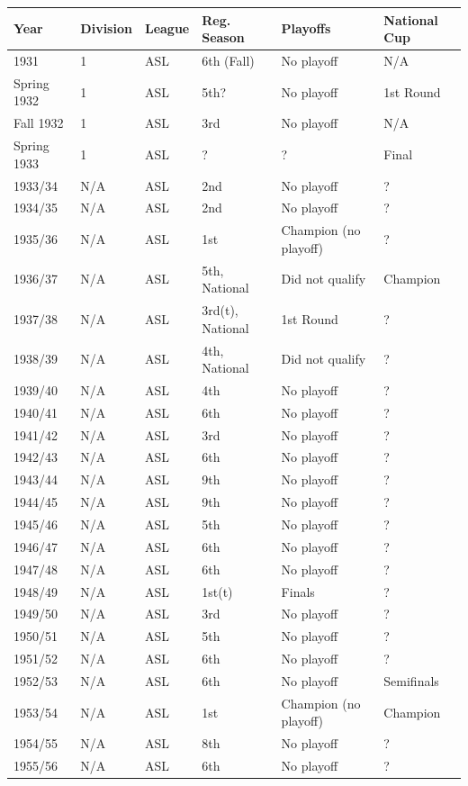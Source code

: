 \documentclass{article}
\begin{document}
\begin{tabular}{llllll}
\toprule
Year & Division & League & Reg. Season & Playoffs & National Cup \\
\midrule
1931 & 1 & ASL & 6th (Fall) & No playoff & N/A \\
Spring 1932 & 1 & ASL & 5th? & No playoff & 1st Round \\
Fall 1932 & 1 & ASL & 3rd & No playoff & N/A \\
Spring 1933 & 1 & ASL & ? & ? & Final \\
1933/34 & N/A & ASL & 2nd & No playoff & ? \\
1934/35 & N/A & ASL & 2nd & No playoff & ? \\
1935/36 & N/A & ASL & 1st & Champion (no playoff) & ? \\
1936/37 & N/A & ASL & 5th, National & Did not qualify & Champion \\
1937/38 & N/A & ASL & 3rd(t), National & 1st Round & ? \\
1938/39 & N/A & ASL & 4th, National & Did not qualify & ? \\
1939/40 & N/A & ASL & 4th & No playoff & ? \\
1940/41 & N/A & ASL & 6th & No playoff & ? \\
1941/42 & N/A & ASL & 3rd & No playoff & ? \\
1942/43 & N/A & ASL & 6th & No playoff & ? \\
1943/44 & N/A & ASL & 9th & No playoff & ? \\
1944/45 & N/A & ASL & 9th & No playoff & ? \\
1945/46 & N/A & ASL & 5th & No playoff & ? \\
1946/47 & N/A & ASL & 6th & No playoff & ? \\
1947/48 & N/A & ASL & 6th & No playoff & ? \\
1948/49 & N/A & ASL & 1st(t) & Finals & ? \\
1949/50 & N/A & ASL & 3rd & No playoff & ? \\
1950/51 & N/A & ASL & 5th & No playoff & ? \\
1951/52 & N/A & ASL & 6th & No playoff & ? \\
1952/53 & N/A & ASL & 6th & No playoff & Semifinals \\
1953/54 & N/A & ASL & 1st & Champion (no playoff) & Champion \\
1954/55 & N/A & ASL & 8th & No playoff & ? \\
1955/56 & N/A & ASL & 6th & No playoff & ? \\
\bottomrule
\end{tabular}
\end{document}
